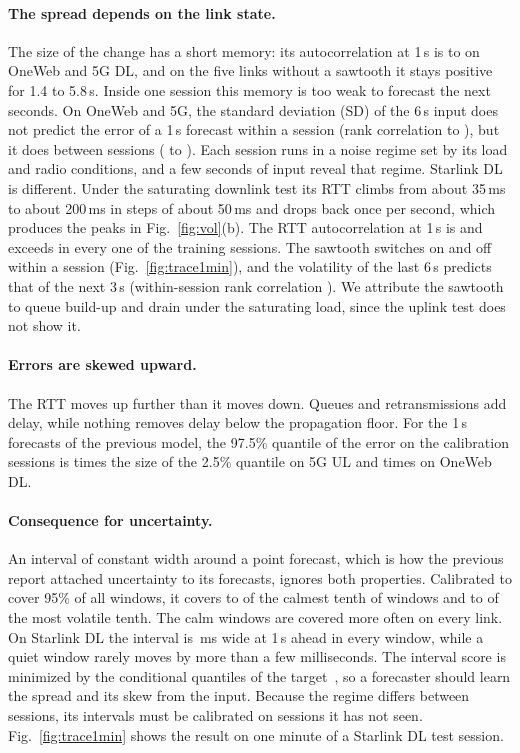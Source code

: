 \paragraph{The spread depends on the link state.} The size of the change has a short memory: its autocorrelation at 1\,s is \VolAbsdLo{} to \VolAbsdHi{} on OneWeb and 5G DL, and on the five links without a sawtooth it stays positive for 1.4 to 5.8\,s. Inside one session this memory is too weak to forecast the next seconds. On OneWeb and 5G, the standard deviation (SD) of the 6\,s input does not predict the error of a 1\,s forecast within a session (rank correlation \VolWithinLo{} to \VolWithinHi), but it does between sessions (\VolBetweenLo{} to \VolBetweenHi). Each session runs in a noise regime set by its load and radio conditions, and a few seconds of input reveal that regime. Starlink DL is different. Under the saturating downlink test its RTT climbs from about 35\,ms to about 200\,ms in steps of about 50\,ms and drops back once per second, which produces the peaks in Fig.~\ref{fig:vol}(b). The RTT autocorrelation at 1\,s is \VolSLDLlevel{} and exceeds \VolSLDLlevelMin{} in every one of the \VolSLDLnSess{} training sessions. The sawtooth switches on and off within a session (Fig.~\ref{fig:trace1min}), and the volatility of the last 6\,s predicts that of the next 3\,s (within-session rank correlation \VolSLDLrv). We attribute the sawtooth to queue build-up and drain under the saturating load, since the uplink test does not show it.

\paragraph{Errors are skewed upward.} The RTT moves up further than it moves down. Queues and retransmissions add delay, while nothing removes delay below the propagation floor. For the 1\,s forecasts of the previous model, the 97.5\% quantile of the error on the calibration sessions is \SkewQUL{} times the size of the 2.5\% quantile on 5G UL and \SkewOWDL{} times on OneWeb DL.

\paragraph{Consequence for uncertainty.} An interval of constant width around a point forecast, which is how the previous report attached uncertainty to its forecasts, ignores both properties. Calibrated to cover 95\% of all windows, it covers \CovConstCalmLo{} to \CovConstCalmHi{} of the calmest tenth of windows and \CovConstVolLo{} to \CovConstVolHi{} of the most volatile tenth. The calm windows are covered more often on every link. On Starlink DL the interval is \WidConstSLDL\,ms wide at 1\,s ahead in every window, while a quiet window rarely moves by more than a few milliseconds. The interval score is minimized by the conditional quantiles of the target~\cite{gneiting2007strictly}, so a forecaster should learn the spread and its skew from the input. Because the regime differs between sessions, its intervals must be calibrated on sessions it has not seen. Fig.~\ref{fig:trace1min} shows the result on one minute of a Starlink DL test session.

